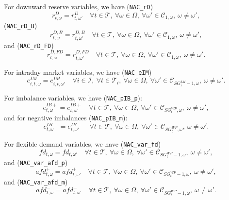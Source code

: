 For downward reserve variables, we have (\verb|NAC_rD|)
\begin{equation} \label{EQ:NAC_pVRD}
	r^D_{t, \omega} = r^D_{t, \omega'} \quad \forall t \in \mathcal{T}, \ \forall \omega \in \Omega, \ \forall \omega' \in \mathcal{C}_{1, \omega}, \ \omega \neq \omega',
\end{equation}
(\verb|NAC_rD_B|)
\begin{equation} \label{EQ:NAC_rDB}
	r^{D, B}_{t, \omega} = r^{D, B}_{t, \omega'} \quad \forall t \in \mathcal{T}, \ \forall \omega \in \Omega, \ \forall \omega' \in \mathcal{C}_{1, \omega}, \ \omega \neq \omega',
\end{equation}
and (\verb|NAC_rD_FD|)
\begin{equation} \label{EQ:NAC_rDFD}
	r^{D, FD}_{t, \omega} = r^{D, FD}_{t, \omega'} \quad \forall t \in \mathcal{T}, \ \forall \omega \in \Omega, \ \forall \omega' \in \mathcal{C}_{1, \omega}, \ \omega \neq \omega'.
\end{equation}


For intraday market variables, we have (\verb|NAC_eIM|)
\begin{equation} \label{EQ:NAC_mUC}
	e^{IM}_{i, t, \omega} = e^{IM}_{i, t, \omega'} \quad \forall i \in \mathcal{I}, \ \forall t \in \mathcal{T}_i, \ \forall \omega \in \Omega, \ \forall \omega' \in \mathcal{C}_{SG^{IM}_i -1, \omega}, \ \omega \neq \omega'.
\end{equation}


For imbalance variables, we have (\verb|NAC_pIB_p|):
\begin{equation} \label{EQ:NAC_pPIB}
	e^{IB+}_{t, \omega} = e^{IB+}_{t, \omega'} \quad \forall t \in \mathcal{T}, \ \forall \omega \in \Omega, \ \forall \omega' \in \mathcal{C}_{SG^{WP}_t, \omega}, \ \omega \neq \omega',
\end{equation}
and for negative imbalances (\verb|NAC_pIB_m|):
\begin{equation} \label{EQ:NAC_pNIB}
	e^{IB-}_{t, \omega} = e^{IB-}_{t, \omega'} \quad \forall t \in \mathcal{T}, \ \forall \omega \in \Omega, \ \forall \omega' \in \mathcal{C}_{SG^{WP}_t, \omega}, \ \omega \neq \omega'.
\end{equation}


For flexible demand variables, we have (\verb|NAC_var_fd|)
\begin{equation} \label{EQ:NAC_var_fd}
	fd_{t, \omega} = fd_{t, \omega'} \quad \forall t \in \mathcal{T}, \ \forall \omega \in \Omega, \ \forall \omega' \in \mathcal{C}_{SG^{WP}_t - 1, \omega}, \ \omega \neq \omega',
\end{equation}
and (\verb|NAC_var_afd_p|)
\begin{equation} \label{EQ:NAC_var_afd_p}
	afd^+_{t, \omega} = afd^+_{t, \omega'} \quad \forall t \in \mathcal{T}, \ \forall \omega \in \Omega, \ \forall \omega' \in \mathcal{C}_{SG^{WP}_t - 1, \omega}, \ \omega \neq \omega',
\end{equation}
and (\verb|NAC_var_afd_m|)
\begin{equation} \label{EQ:NAC_var_afd_m}
	afd^-_{t, \omega} = afd^-_{t, \omega'} \quad \forall t \in \mathcal{T}, \ \forall \omega \in \Omega, \ \forall \omega' \in \mathcal{C}_{SG^{WP}_t - 1, \omega}, \ \omega \neq \omega'.
\end{equation}



